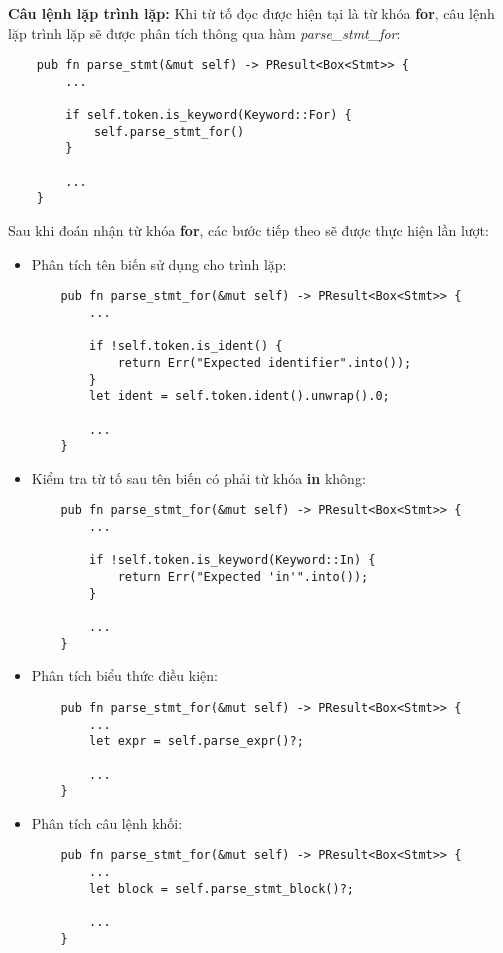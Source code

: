 \textbf{Câu lệnh lặp trình lặp:} Khi từ tố đọc được hiện tại là từ khóa \textbf{for}, câu lệnh lặp trình lặp sẽ được phân tích thông qua hàm \textit{parse\_stmt\_for}:
\begin{lstlisting}
    pub fn parse_stmt(&mut self) -> PResult<Box<Stmt>> {
        ...
    
        if self.token.is_keyword(Keyword::For) {
            self.parse_stmt_for()
        } 
        
        ...
    }
\end{lstlisting}
Sau khi đoán nhận từ khóa \textbf{for}, các bước tiếp theo sẽ được thực hiện lần lượt:
\begin{itemize}
    \item Phân tích tên biến sử dụng cho trình lặp:
\begin{lstlisting}
    pub fn parse_stmt_for(&mut self) -> PResult<Box<Stmt>> {
        ...

        if !self.token.is_ident() {
            return Err("Expected identifier".into());
        }
        let ident = self.token.ident().unwrap().0;

        ...
    }
\end{lstlisting}
    \item Kiểm tra từ tố sau tên biến có phải từ khóa \textbf{in} không:
\begin{lstlisting}
    pub fn parse_stmt_for(&mut self) -> PResult<Box<Stmt>> {
        ...

        if !self.token.is_keyword(Keyword::In) {
            return Err("Expected 'in'".into());
        }

        ...
    }
\end{lstlisting}
    \item Phân tích biểu thức điều kiện:
\begin{lstlisting}
    pub fn parse_stmt_for(&mut self) -> PResult<Box<Stmt>> {
        ...
        let expr = self.parse_expr()?;

        ...
    }
\end{lstlisting}
    \item Phân tích câu lệnh khối:
\begin{lstlisting}
    pub fn parse_stmt_for(&mut self) -> PResult<Box<Stmt>> {
        ...
        let block = self.parse_stmt_block()?;

        ...
    }
\end{lstlisting}
\end{itemize}

